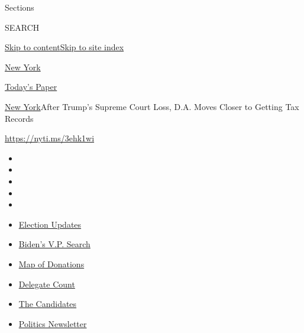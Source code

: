Sections

SEARCH

\protect\hyperlink{site-content}{Skip to
content}\protect\hyperlink{site-index}{Skip to site index}

\href{https://www.nytimes.com/section/nyregion}{New York}

\href{https://myaccount.nytimes.com/auth/login?response_type=cookie\&client_id=vi}{}

\href{https://www.nytimes.com/section/todayspaper}{Today's Paper}

\href{/section/nyregion}{New York}\textbar{}After Trump's Supreme Court
Loss, D.A. Moves Closer to Getting Tax Records

\url{https://nyti.ms/3ehk1wi}

\begin{itemize}
\item
\item
\item
\item
\item
\end{itemize}

\begin{itemize}
\item
  \href{https://www.nytimes.com/2020/08/03/us/elections/biden-vs-trump.html?action=click\&pgtype=Article\&state=default\&region=TOP_BANNER\&context=storylines_menu}{Election
  Updates}
\item
  \href{https://www.nytimes.com/article/biden-vice-president-2020.html?action=click\&pgtype=Article\&state=default\&region=TOP_BANNER\&context=storylines_menu}{Biden's
  V.P. Search}
\item
  \href{https://www.nytimes.com/interactive/2020/07/24/us/politics/trump-biden-campaign-donors.html?action=click\&pgtype=Article\&state=default\&region=TOP_BANNER\&context=storylines_menu}{Map
  of Donations}
\item
  \href{https://www.nytimes.com/interactive/2020/us/elections/delegate-count-primary-results.html?action=click\&pgtype=Article\&state=default\&region=TOP_BANNER\&context=storylines_menu}{Delegate
  Count}
\item
  \href{https://www.nytimes.com/interactive/2019/us/politics/2020-presidential-candidates.html?action=click\&pgtype=Article\&state=default\&region=TOP_BANNER\&context=storylines_menu}{The
  Candidates}
\item
  \href{https://www.nytimes.com/newsletters/politics?action=click\&pgtype=Article\&state=default\&region=TOP_BANNER\&context=storylines_menu}{Politics
  Newsletter}
\end{itemize}

